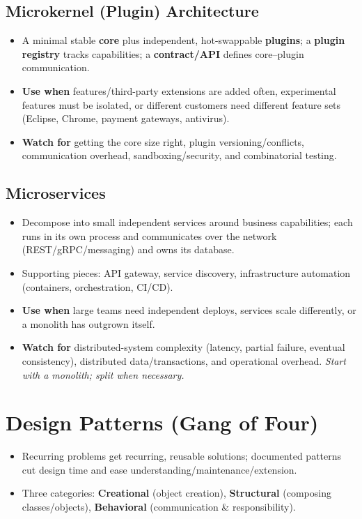 \documentclass[hidelinks]{article}
\begin{document}
\subsection{Microkernel (Plugin) Architecture}
\begin{itemize}
  \item A minimal stable \textbf{core} plus independent, hot-swappable \textbf{plugins}; a
        \textbf{plugin registry} tracks capabilities; a \textbf{contract/API} defines core--plugin
        communication.
  \item \textbf{Use when} features/third-party extensions are added often, experimental features
        must be isolated, or different customers need different feature sets (Eclipse, Chrome,
        payment gateways, antivirus).
  \item \textbf{Watch for} getting the core size right, plugin versioning/conflicts, communication
        overhead, sandboxing/security, and combinatorial testing.
\end{itemize}

\subsection{Microservices}
\begin{itemize}
  \item Decompose into small independent services around business capabilities; each runs in its
        own process and communicates over the network (REST/gRPC/messaging) and owns its database.
  \item Supporting pieces: API gateway, service discovery, infrastructure automation (containers,
        orchestration, CI/CD).
  \item \textbf{Use when} large teams need independent deploys, services scale differently, or a
        monolith has outgrown itself.
  \item \textbf{Watch for} distributed-system complexity (latency, partial failure, eventual
        consistency), distributed data/transactions, and operational overhead. \emph{Start with a
        monolith; split when necessary.}
\end{itemize}

\section{Design Patterns (Gang of Four)}
\begin{itemize}
  \item Recurring problems get recurring, reusable solutions; documented patterns cut design time
        and ease understanding/maintenance/extension.
  \item Three categories: \textbf{Creational} (object creation), \textbf{Structural} (composing
        classes/objects), \textbf{Behavioral} (communication \& responsibility).
\end{itemize}
\end{document}
